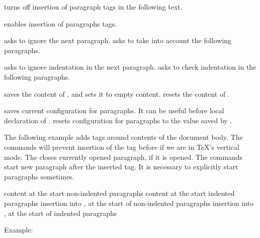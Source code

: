  turns off insertion of paragraph tags in the following text.

 enables insertion of paragraphs tags.

 asks to ignore the next paragraph.
 asks to take into account the following paragraphs.

  asks to ignore indentation in the next paragraph.
    asks to check indentation in the following paragraphs.

  saves the content of , and sets it to empty content.
 resets the content of .

 saves current configuration for paragraphs. It can be
useful before local declaration of .
 resets configuration for paragraphs to the value saved by
.


The following example adds  tags around contents of the document body.
The \texcommand{\ifvmode\IgnorePar\fi} commands will prevent insertion of the  tag 
before  if we are in \TeX's vertical mode. The \texcommand{\EndP} closes currently
opened paragraph, if it is opened. The \texcommand{\par\ShowPar} commands start new paragraph
after the inserted  tag. It is necessary to explicitly start paragraphs sometimes.

\begin{texsource}
{\ifvmode\IgnorePar\fi\EndP
 \par\ShowPar}
{\ifvmode\IgnorePar\fi\EndP
 }
\end{texsource}


 {content at the start non-indented paragraphs} 
   {content at the start indented paragraphs}
   {insertion into , at the start of non-indented paragraphs}
   {insertion into , at the start of indented paragraphs}\EndDoc

Example:

\begin{texsource}
{\EndP{}}
{\EndP{}}
{}
{}
\end{texsource}

